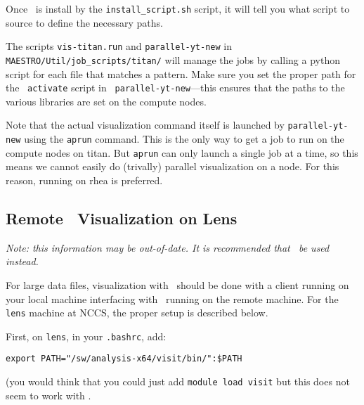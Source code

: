 Once \yt\ is install by the {\tt install\_script.sh} script, it will
tell you what script to source to define the necessary paths.

The scripts {\tt vis-titan.run} and {\tt parallel-yt-new} in {\tt
MAESTRO/Util/job\_scripts/titan/} will manage the \yt jobs by calling a
python script for each file that matches a pattern.  Make sure you set
the proper path for the \yt\ {\tt activate} script in {\tt
parallel-yt-new}---this ensures that the paths to the various libraries
are set on the compute nodes.

Note that the actual visualization command itself is launched by
{\tt parallel-yt-new} using the {\tt aprun} command.  This is the
only way to get a job to run on the compute nodes on titan.  But
{\tt aprun} can only launch a single job at a time, so this means
we cannot easily do (trivally) parallel visualization on a node.  For
this reason, running on rhea is preferred.


\subsection{Remote \visit\ Visualization on Lens}

{\em Note: this information may be out-of-date.  It is recommended that
 \yt\ be used instead.}

For large data files, visualization with \visit\ should be done with
a client running on your local machine interfacing with \visit\ running
on the remote machine.  For the {\tt lens} machine at NCCS, the proper setup
is described below.

First, on {\tt lens}, in your {\tt .bashrc}, add:
\begin{verbatim}
export PATH="/sw/analysis-x64/visit/bin/":$PATH
\end{verbatim}
(you would think that you could just add {\tt module load visit} but this
does not seem to work with \visit.

